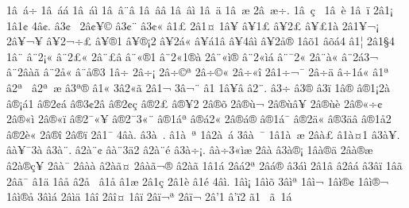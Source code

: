{1^^e2^^a0^^e1^^f7
1^^e2^^a0^^e1^^e1
1^^e2^^a0^^e1^^ec
1^^e2^^a0^^e2^^a8^^e2
1^^e2^^a0^^e2^^e2
1^^e2^^a0^^e2^^ec
1^^e2^^a0^^e4
1^^e2^^a0^^e6
2^^e2^^a0^^e6^^f7.
1^^e2^^a0^^e7^^a0^^ad
1^^e2^^a0^^e8
1^^e2^^a0^^ef
2^^e21^^a1
1^^e21^^a2
4^^e2^^a2.
^^e23^^a2^^a0
2^^e2^^a2^^a5^^a9
^^e23^^a2^^a8
^^e23^^a2^^ab
^^e21^^a3
2^^e21^^a4
1^^e2^^a5
^^e2^^a51^^a3
^^e2^^a52^^a3^^ad
^^e2^^a5^^a31^^e0
2^^e21^^a5^^ac^^a1
2^^e2^^a5^^ac^^a5
^^e2^^a52^^ac^^f7^^a3
^^e2^^a5^^ae1
^^e2^^a5^^ae^^a12
^^e2^^a52^^e1^^ab
^^e2^^a5^^e11^^e2
^^e2^^a54^^e2^^ec
^^e2^^a52^^e5^^ae
1^^e2^^f51
^^e2^^f5^^e14
^^e21^^a6
2^^e21^^a74
1^^e2^^a8
^^e2^^a82^^a1^^ab
^^e2^^a82^^a3^^ab
2^^e2^^a8^^a3^^e2
^^e2^^a8^^ab^^ae1
^^e2^^a82^^ab1^^ae^^e0
2^^e2^^a8^^ab^^ec^^ae
^^e2^^a82^^ab^^ec^^e1
^^e2^^a8^^af2^^ab
2^^e2^^a8^^e0^^ab
^^e2^^a82^^e13^^ac
^^e2^^a82^^e2^^e0^^e3
^^e2^^a82^^e5^^ab
^^e2^^a8^^e5^^ae3
1^^e2^^f7
2^^e2^^f7^^a1
2^^e2^^f7^^a9^^aa
2^^e2^^f7^^a9^^ab
2^^e2^^f7^^ab^^ee
2^^e21^^f7^^ac^^af
2^^e2^^f7^^ad^^e4
^^e2^^f71^^e1^^ab
^^e21^^aa
^^e22^^aa^^a0^^ad
^^e22^^aa^^a0^^e6
^^e23^^aa^^ae
^^e21^^ab
3^^e22^^ab^^e3
2^^e21^^ac
3^^e2^^ac^^a8
^^e21^^ad
1^^e2^^ad^^a5^^e2
^^e22^^ad^^a8.
^^e23^^ad^^f7
^^e23^^ad^^ae
^^e23^^ad^^ef
1^^e2^^ae
^^e2^^ae1^^a12^^e0
^^e2^^ae^^a1^^e11
^^e2^^ae2^^a2^^e1
^^e2^^ae3^^a22^^e2
^^e2^^ae2^^a2^^e7
^^e2^^ae2^^a3^^ad
^^e2^^ae^^a52
2^^e2^^ae^^f5
2^^e2^^ae^^f9^^ac
2^^e2^^ae^^f9^^e2^^a5
2^^e2^^ae^^f9^^e8
2^^e2^^ae^^ab^^f7^^a2
2^^e2^^ae^^ab^^ec^^ad
2^^e2^^ae^^ab^^ef
^^e2^^ae2^^af^^ab^^a5
^^e2^^ae2^^af3^^ab^^a8
^^e2^^ae1^^e1^^aa
^^e2^^ae^^e12^^ab
2^^e2^^ae^^e1^^ae
^^e2^^ae1^^e1^^af
^^e2^^ae2^^e4^^ab
^^e2^^ae3^^e4^^e2
^^e2^^ae1^^e52
^^e2^^ae2^^e8^^ab
2^^e2^^ae^^ee
2^^e2^^ae^^ef
2^^e21^^af
4^^e2^^e0.
^^e23^^e0^^a0.
^^e21^^e0^^a0^^aa
1^^e22^^e0^^a0^^ad^^e1
3^^e2^^e0^^a0^^af
1^^e21^^e0^^a0^^e6
2^^e2^^e0^^a3
^^e21^^e0^^a41
^^e23^^e0^^a5.
^^e2^^e0^^a5^^af3^^e0
^^e23^^e0^^a8.
^^e22^^e0^^a8^^a2
^^e2^^e0^^a83^^e42
^^e22^^e0^^a8^^e9
^^e23^^e0^^f7^^a1.
^^e2^^e0^^f73^^ab^^ec^^e6
2^^e2^^e0^^ad
^^e23^^e0^^ae^^a1
1^^e2^^e0^^ae^^e4
2^^e2^^e0^^ae^^e6
^^e22^^e0^^ae^^e7^^a5
2^^e2^^e0^^af
2^^e2^^e0^^e0
^^e22^^e0^^e3^^a4
2^^e2^^e0^^e3^^ac^^ae
^^e22^^e0^^e3^^ad^^ad
1^^e21^^e1
2^^e2^^e12^^aa
2^^e2^^e1^^ae
^^e23^^e1^^ec
2^^e21^^e2
^^e22^^e2^^e1
^^e23^^e2^^ef
1^^e2^^e3
2^^e2^^e3^^af
^^e21^^e4
1^^e2^^e5
^^e22^^e5^^a0
^^e21^^e5^^ad
^^e21^^e6
2^^e21^^e7
2^^e21^^e8
^^e21^^e9
4^^e2^^ec.
1^^e2^^ec^^a1
1^^e2^^ec^^f5
3^^e2^^ec^^aa
1^^e2^^ec^^ac
1^^e2^^ec^^ae^^a2
1^^e2^^ec^^ae^^ac
1^^e2^^ec^^ae^^e5
3^^e2^^ec^^e1
2^^e2^^ec^^e4
1^^e2^^ee
2^^e2^^ee^^a4
1^^e2^^ef
2^^e2^^ef^^ac^^aa
2^^e2^^ef^^ac^^ad
2^^e2'1
^^e2'^^ef2
^^e31^^a0
^^e3^^a01^^e1
}
